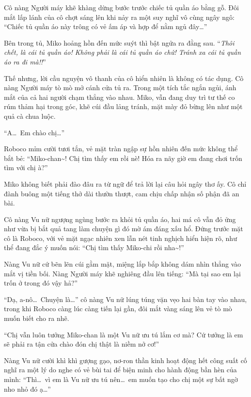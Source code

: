 \documentclass[../main.tex]{subfiles}
\begin{document}

Cô nàng Người máy khẽ khàng dừng bước trước chiếc tủ quần áo bằng gỗ. Đôi mắt lấp lánh của cô chợt sáng lên khi nảy ra một suy nghĩ vô cùng ngây ngô: ``Chiếc tủ quần áo này trông có vẻ ấm áp và hợp để nằm ngủ đây\dots''

Bên trong tủ, Miko hoảng hồn đến mức suýt thì bật ngửa ra đằng sau. ``\textit{Thôi chết, là cái tủ quần áo! Không phải là cái tủ quần áo chứ! Tránh xa cái tủ quần áo ra đi mà!!}''


Thế nhưng, lời cầu nguyện vô thanh của cô hiển nhiên là không có tác dụng. Cô nàng Người máy tò mò mở cánh cửa tủ ra. Trong một tích tắc ngắn ngủi, ánh mắt của cả hai người chạm thẳng vào nhau. Miko, vẫn đang duy trì tư thế co rúm thảm hại trong góc, khẽ cúi đầu lảng tránh, mặt mày đỏ bừng lên như một quả cà chua luộc.

``A\dots\ Em chào chị\dots''

Roboco mỉm cười tươi tắn, vẻ mặt tràn ngập sự hồn nhiên đến mức không thể bắt bẻ: ``Miko-chan\~{}! Chị tìm thấy em rồi nè! Hóa ra nãy giờ em đang chơi trốn tìm với chị à?''

Miko không biết phải đào đâu ra từ ngữ để trả lời lại câu hỏi ngây thơ ấy. Cô chỉ đành buông một tiếng thở dài thườn thượt, cam chịu chấp nhận số phận đã an bài.

\ct

Cô nàng Vu nữ ngượng ngùng bước ra khỏi tủ quần áo, hai má cô vẫn đỏ ửng như vừa bị bắt quả tang làm chuyện gì đó mờ ám đáng xấu hổ. Đứng trước mặt cô là Roboco, với vẻ mặt ngạc nhiên xen lẫn nét tinh nghịch hiển hiện rõ, như thể đang đắc ý muốn nói: ``Chị tìm thấy Miko-chi rồi nha\~{}!''

Nàng Vu nữ cứ bẽn lẽn cúi gằm mặt, miệng lắp bắp không dám nhìn thẳng vào mắt vị tiền bối. Nàng Người máy khẽ nghiêng đầu lên tiếng: ``Mà tại sao em lại trốn ở trong đó vậy hả?''

``Dạ, a-nô\dots\ Chuyện là\dots'' cô nàng Vu nữ lúng túng vặn vẹo hai bàn tay vào nhau, trong khi Roboco càng lúc càng tiến lại gần, đôi mắt vàng sáng lên vẻ tò mò muốn biết cho ra nhẽ.

``Chị vẫn luôn tưởng Miko-chan là một Vu nữ ưu tú lắm cơ mà? Cứ tưởng là em sẽ phải ra tận cửa chào đón chị thật là niềm nở cơ!''

Nàng Vu nữ cười khì khì gượng gạo, nơ-ron thần kinh hoạt động hết công suất cố nghĩ ra một lý do nghe có vẻ bùi tai để biện minh cho hành động bần hèn của mình: ``Thì\dots\ vì em là Vu nữ ưu tú nên\dots\ em muốn tạo cho chị một sự bất ngờ nho nhỏ đó ạ\dots''
\end{document}
